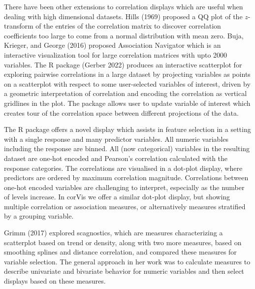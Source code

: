 There have been other extensions to correlation displays which are useful when dealing with high dimensional datasets.
Hills (1969) proposed a QQ plot of the \(z\)-transform of the entries of the correlation matrix to discover correlation coefficients too large to come from a normal distribution with mean zero. Buja, Krieger, and George (2016) proposed Association Navigator which is an interactive visualization tool for large correlation matrices with upto 2000 variables. The R package  (Gerber 2022) produces an interactive scatterplot for exploring pairwise correlations in a large dataset by projecting variables as points on a scatterplot with respect to some user-selected variables of interest, driven by a geometric interpretation of correlation and encoding the correlation as vertical gridlines in the plot. The package allows user to update variable of interest which creates tour of the correlation space between different projections of the data.

The R package  offers a novel display which assists in feature selection in a setting with a single response and many predictor variables. All numeric variables including the response are binned. All (now categorical) variables in the resulting dataset are one-hot encoded and Pearson's correlation calculated with the response categories. The correlations are visualised in a dot-plot display, where predictors are ordered by maximum correlation magnitude. Correlations between one-hot encoded variables are challenging to interpret, especially as the number of levels increase. In corVis we offer a similar dot-plot display, but showing multiple correlation or association measures, or alternatively measures stratified by a grouping variable.

Grimm (2017) explored scagnostics, which are measures characterizing a scatterplot based on trend or density, along with two more measures, based on smoothing splines and distance correlation, and compared these measures for variable selection. The general approach in her work was to calculate measures to describe univariate and bivariate behavior for numeric variables and then select displays based on these measures.

